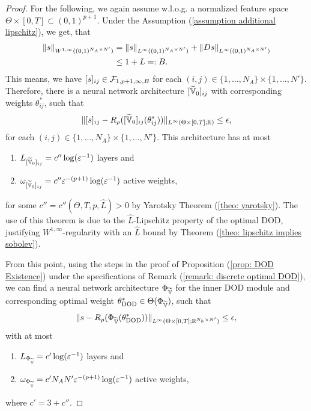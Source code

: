 \begin{proof}
    For the following,
    we again assume w.l.o.g. a normalized 
    feature space $\Theta \times [0, T] \subset (0, 1)^{p+1}$.
    Under the Assumption (\ref{assumption additional lipschitz}),
    we get, that 
    \begin{align*}
        \lVert s \rVert_{W^{1, \infty}((0,1)^{N_A \times N'})} &= \lVert s \rVert_{L^\infty((0,1)^{N_A \times N'})} + 
        \lVert D s \rVert_{L^\infty((0,1)^{N_A \times N'})} \\
        &\leq 1 + L =: B.
    \end{align*}
    This means, we have $[s]_{ij} \in \mathcal{F}_{1, p+1, \infty, B}$ for each $(i, j) \in \{1, \dots, N_A\} \times \{1, \dots, N'\}$.
    Therefore, there is
    a neural network architecture $[\widetilde{\mathbb{V}}_0]_{ij}$
    with corresponding weights $\theta^*_{ij}$, such that
    \begin{equation*}
        \lVert [s]_{ij} - R_\rho([\widetilde{\mathbb{V}}_0]_{ij}(\theta^*_{ij})) \rVert_{L^\infty(\Theta \times [0, T]; \mathbb{R})} \leq \epsilon,
    \end{equation*}
    for each $(i, j) \in \{1, \dots, N_A\} \times \{1, \dots, N'\}$. This architecture has at most 
    \begin{enumerate}
        \item[-] $L_{[\widetilde{\mathbb{V}}_0]_{ij}} = c'' \log(\varepsilon^{-1})$ layers and
        \item[-] $\omega_{[\widetilde{\mathbb{V}}_0]_{ij}} = c'' \varepsilon^{-(p+1)} \log(\varepsilon^{-1})$ active weights,
    \end{enumerate}
    for some $c'' = c''(\Theta, T, p, \hat{L}) > 0$ by Yarotsky Theorem (\ref{theo: yarotsky}). 
    The use of this theorem is due to 
    the $\hat{L}$-Lipschitz property of the optimal DOD, justifying $W^{1, \infty}$-regularity
    with an $\hat{L}$ bound by Theorem (\ref{theo: lipschitz implies sobolev}).

    From this point, 
    using the steps in the proof of Proposition (\ref{prop: DOD Existence}) under the specifications of Remark
    (\ref{remark: discrete optimal DOD}), we can find a neural network architecture $\Phi_{\widetilde{\mathbb{V}}}$ for
    the inner DOD module and corresponding optimal weight $\theta^*_\text{DOD} \in \Theta(\Phi_{\widetilde{\mathbb{V}}})$,
    such that
    \begin{equation*}
        \lVert s - R_\rho(\Phi_{\widetilde{\mathbb{V}}}(\theta^*_\text{DOD})) \rVert_{L^\infty(\Theta \times [0, T]; \mathbb{R}^{N_h \times N'})} 
        \leq \epsilon,
    \end{equation*}
    with at most
    \begin{enumerate}
        \item[-] $L_{\Phi_{\widetilde{\mathbb{V}}}} = c' \log(\varepsilon^{-1})$ layers and
        \item[-] $\omega_{\Phi_{\widetilde{\mathbb{V}}}} = c' N_A N' \varepsilon^{-(p+1)} \log(\varepsilon^{-1})$ active weights,
    \end{enumerate}
    where $c' = 3 + c''$.


\end{proof}
